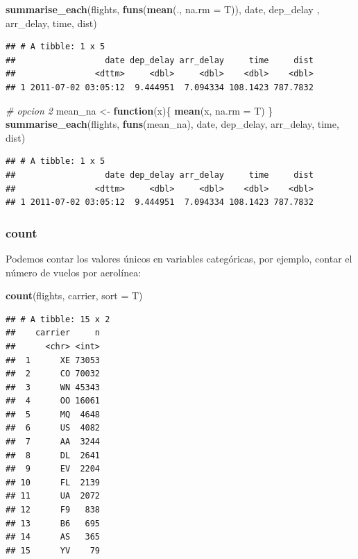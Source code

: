\documentclass[]{article}
\newenvironment{Shaded}{\begin{snugshade}}{\end{snugshade}}
\newcommand{\KeywordTok}[1]{\textcolor[rgb]{0.13,0.29,0.53}{\textbf{#1}}}
\newcommand{\DataTypeTok}[1]{\textcolor[rgb]{0.13,0.29,0.53}{#1}}
\newcommand{\StringTok}[1]{\textcolor[rgb]{0.31,0.60,0.02}{#1}}
\newcommand{\CommentTok}[1]{\textcolor[rgb]{0.56,0.35,0.01}{\textit{#1}}}
\newcommand{\ControlFlowTok}[1]{\textcolor[rgb]{0.13,0.29,0.53}{\textbf{#1}}}
\newcommand{\NormalTok}[1]{#1}
\begin{document}
\begin{Shaded}
\begin{Highlighting}[]
\KeywordTok{summarise_each}\NormalTok{(flights, }\KeywordTok{funs}\NormalTok{(}\KeywordTok{mean}\NormalTok{(., }\DataTypeTok{na.rm =}\NormalTok{ T)), date, dep_delay}
\NormalTok{               , arr_delay, time, dist)}
\end{Highlighting}
\end{Shaded}

\begin{verbatim}
## # A tibble: 1 x 5
##                  date dep_delay arr_delay     time     dist
##                <dttm>     <dbl>     <dbl>    <dbl>    <dbl>
## 1 2011-07-02 03:05:12  9.444951  7.094334 108.1423 787.7832
\end{verbatim}

\begin{Shaded}
\begin{Highlighting}[]
\CommentTok{# opcion 2}
\NormalTok{mean_na <-}\StringTok{ }\ControlFlowTok{function}\NormalTok{(x)\{}
  \KeywordTok{mean}\NormalTok{(x, }\DataTypeTok{na.rm =}\NormalTok{ T)}
\NormalTok{\}}
\KeywordTok{summarise_each}\NormalTok{(flights, }\KeywordTok{funs}\NormalTok{(mean_na), date, dep_delay, arr_delay, time, dist)}
\end{Highlighting}
\end{Shaded}

\begin{verbatim}
## # A tibble: 1 x 5
##                  date dep_delay arr_delay     time     dist
##                <dttm>     <dbl>     <dbl>    <dbl>    <dbl>
## 1 2011-07-02 03:05:12  9.444951  7.094334 108.1423 787.7832
\end{verbatim}

\subsubsection{count}\label{count}

Podemos contar los valores únicos en variables categóricas, por ejemplo,
contar el número de vuelos por aerolínea:

\begin{Shaded}
\begin{Highlighting}[]
\KeywordTok{count}\NormalTok{(flights, carrier, }\DataTypeTok{sort =}\NormalTok{ T)}
\end{Highlighting}
\end{Shaded}

\begin{verbatim}
## # A tibble: 15 x 2
##    carrier     n
##      <chr> <int>
##  1      XE 73053
##  2      CO 70032
##  3      WN 45343
##  4      OO 16061
##  5      MQ  4648
##  6      US  4082
##  7      AA  3244
##  8      DL  2641
##  9      EV  2204
## 10      FL  2139
## 11      UA  2072
## 12      F9   838
## 13      B6   695
## 14      AS   365
## 15      YV    79
\end{verbatim}
\end{document}
